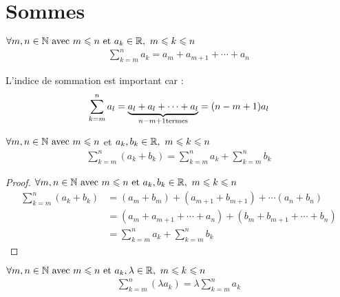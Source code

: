 \section{Sommes}

\begin{graybox}
	\begin{definition}
		$\forall m, n \in \mathbb{N} \textnormal{ avec } m \leqslant n \textnormal{ et } a_k \in \mathbb{R}, \ m \leqslant k \leqslant n$
		\begin{align*}
			\sum_{k = m}^{n}a_k = a_m + a_{m+1} + \cdots + a_n	
		\end{align*}
	\end{definition}
\end{graybox}

\begin{remarque}
	L'indice de sommation est important car :
	\begin{align*}
		\sum_{k = m}^{n}a_l = \underbrace{a_l + a_l + \cdots + a_l}_{n - m + 1 \textnormal{termes}} = (n - m + 1)a_l
	\end{align*}
\end{remarque}

\begin{graybox}
	\begin{proposition}
		$\forall m, n \in \mathbb{N} \textnormal{ avec } m \leqslant n$ et $a_k, b_k \in \mathbb{R}, \ m \leqslant k \leqslant n$
		\begin{align*}
			\sum_{k = m}^{n} (a_k + b_k) = \sum_{k=m}^{n}a_k + \sum_{k=m}^{n}b_k	
		\end{align*}
	\end{proposition}
\end{graybox}

\begin{proof}
	$\forall m, n \in \mathbb{N} \textnormal{ avec } m \leqslant n \textnormal{ et } a_k, b_k \in \mathbb{R}, \ m \leqslant k \leqslant n$
	\begin{align*}
		\sum_{k = m}^{n} (a_k + b_k) &= (a_m + b_m) + (a_{m+1} + b_{m+1}) + \cdots (a_n + b_n)\\
		&= (a_m + a_{m+1} + \cdots + a_n) + (b_m + b_{m+1} + \cdots + b_n) \\
		&= \sum_{k=m}^{n}a_k + \sum_{k=m}^{n}b_k
	\end{align*}
\end{proof}

\begin{graybox}
	\begin{proposition}
		$\forall m, n \in \mathbb{N} \textnormal{ avec } m \leqslant n \textnormal{ et } a_k, \lambda \in \mathbb{R}, \ m \leqslant k \leqslant n$
		\begin{align*}
			\sum_{k = m}^{n} (\lambda a_k) = \lambda \sum_{k = m}^{n} a_k	
		\end{align*}
	\end{proposition}
\end{graybox}


